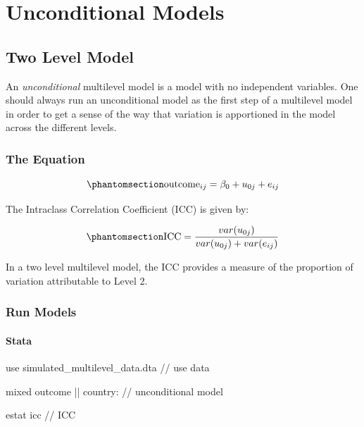 \documentclass[
  letterpaper,
  DIV=11,
  numbers=noendperiod]{scrreprt}
\newenvironment{Shaded}{\begin{snugshade}}{\end{snugshade}}
\newcommand{\CommentTok}[1]{\textcolor[rgb]{0.37,0.37,0.37}{#1}}
\newcommand{\KeywordTok}[1]{\textcolor[rgb]{0.00,0.23,0.31}{#1}}
\newcommand{\NormalTok}[1]{\textcolor[rgb]{0.00,0.23,0.31}{#1}}
\begin{document}

\chapter{Unconditional Models}\label{unconditional-models}

\section{Two Level Model}\label{two-level-model}

An \emph{unconditional} multilevel model is a model with no independent
variables. One should always run an unconditional model as the first
step of a multilevel model in order to get a sense of the way that
variation is apportioned in the model across the different levels.

\subsection{The Equation}\label{the-equation}

\begin{equation}\phantomsection\label{eq-MLMunconditional}{\text{outcome}_{ij}= \beta_0 + u_{0j} + e_{ij}}\end{equation}

The Intraclass Correlation Coefficient (ICC) is given by:

\begin{equation}\phantomsection\label{eq-ICCunconditional}{\text{ICC} = \frac{var(u_{0j})}{var(u_{0j}) + var(e_{ij})}}\end{equation}

In a two level multilevel model, the ICC provides a measure of the
proportion of variation attributable to Level 2.

\subsection{Run Models}\label{run-models}

\subsubsection{Stata}

\begin{Shaded}
\begin{Highlighting}[]

\KeywordTok{use}\NormalTok{ simulated\_multilevel\_data.dta }\CommentTok{// use data}

\NormalTok{mixed outcome || country:  }\CommentTok{// unconditional model}

\KeywordTok{estat}\NormalTok{ icc }\CommentTok{// ICC}
\end{Highlighting}
\end{Shaded}
\end{document}

